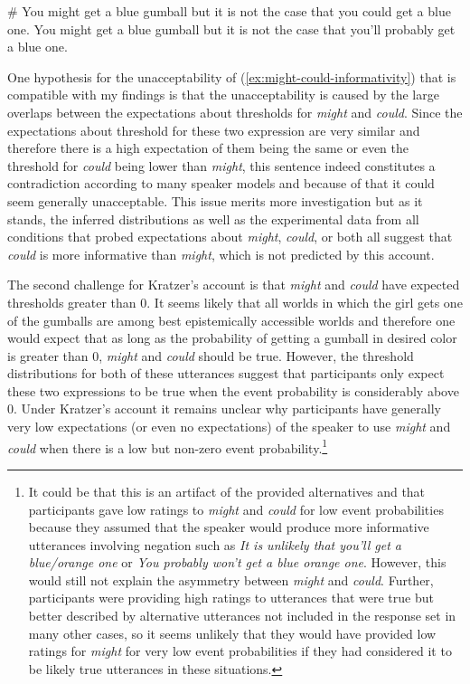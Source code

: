 \begin{exe}
\ex \label{ex:might-could-informativity} \# You might get a blue gumball but it is not the case that you could get a blue one.
\ex \label{ex:might-probably-informativity} You might get a blue gumball but it is not the case that you'll probably get a blue one.
\end{exe}

\noindent One hypothesis for the unacceptability of (\ref{ex:might-could-informativity}) that is compatible with my findings is
that the unacceptability is caused by the large overlaps between the expectations about thresholds for \textit{might} and \textit{could}. 
Since the expectations about threshold for these two expression are very similar and therefore there is a 
high expectation of them being the same or even the threshold for \textit{could} being lower than \textit{might}, this sentence
indeed constitutes a contradiction according to many speaker models and  because of that it could seem generally unacceptable.
This issue merits more investigation but as it stands,  the inferred distributions as well as the experimental data from all conditions
that probed expectations about \textit{might}, \textit{could}, or both all suggest that \textit{could} is more informative than \textit{might}, which is not
predicted by this account.

The second challenge for Kratzer's account is that \textit{might} and \textit{could} have expected thresholds greater than 0.
It seems likely that all worlds in which the girl gets one of the gumballs are among best epistemically accessible worlds 
and therefore one would expect that as long as the probability of getting a gumball in desired color is greater than 0, \textit{might} 
and \textit{could} should be true. However, the threshold distributions for both of these utterances suggest that participants only
expect these two expressions to be true when the event probability is considerably above 0. Under Kratzer's account it remains unclear
why participants have generally very low expectations (or even no expectations) of the speaker to use \textit{might} and \textit{could}
when there is a low but non-zero event probability.\footnote{It could be that this is an artifact of the provided alternatives and that participants gave
low ratings to \textit{might} and \textit{could} for low event probabilities because they assumed that the speaker would produce more informative utterances
involving negation such as \emph{It is unlikely that you'll get a blue/orange one} or \emph{You probably won't get a blue orange one}. However, this would still not explain
the asymmetry between \textit{might} and \textit{could}. Further, participants were providing high ratings to utterances that were true but better described by alternative utterances not included
in the response set in many other cases, so it seems unlikely that they would have provided low ratings for \textit{might} for very low event probabilities if they had considered 
it to be likely true utterances in these situations.}

